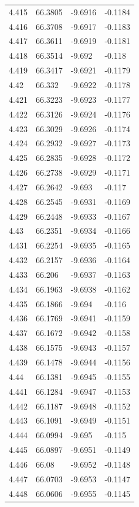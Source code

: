 \begin{tabular}{llll}
4.415 & 66.3805 & -9.6916 & -0.1184 \\
4.416 & 66.3708 & -9.6917 & -0.1183 \\
4.417 & 66.3611 & -9.6919 & -0.1181 \\
4.418 & 66.3514 & -9.692 & -0.118 \\
4.419 & 66.3417 & -9.6921 & -0.1179 \\
4.42 & 66.332 & -9.6922 & -0.1178 \\
4.421 & 66.3223 & -9.6923 & -0.1177 \\
4.422 & 66.3126 & -9.6924 & -0.1176 \\
4.423 & 66.3029 & -9.6926 & -0.1174 \\
4.424 & 66.2932 & -9.6927 & -0.1173 \\
4.425 & 66.2835 & -9.6928 & -0.1172 \\
4.426 & 66.2738 & -9.6929 & -0.1171 \\
4.427 & 66.2642 & -9.693 & -0.117 \\
4.428 & 66.2545 & -9.6931 & -0.1169 \\
4.429 & 66.2448 & -9.6933 & -0.1167 \\
4.43 & 66.2351 & -9.6934 & -0.1166 \\
4.431 & 66.2254 & -9.6935 & -0.1165 \\
4.432 & 66.2157 & -9.6936 & -0.1164 \\
4.433 & 66.206 & -9.6937 & -0.1163 \\
4.434 & 66.1963 & -9.6938 & -0.1162 \\
4.435 & 66.1866 & -9.694 & -0.116 \\
4.436 & 66.1769 & -9.6941 & -0.1159 \\
4.437 & 66.1672 & -9.6942 & -0.1158 \\
4.438 & 66.1575 & -9.6943 & -0.1157 \\
4.439 & 66.1478 & -9.6944 & -0.1156 \\
4.44 & 66.1381 & -9.6945 & -0.1155 \\
4.441 & 66.1284 & -9.6947 & -0.1153 \\
4.442 & 66.1187 & -9.6948 & -0.1152 \\
4.443 & 66.1091 & -9.6949 & -0.1151 \\
4.444 & 66.0994 & -9.695 & -0.115 \\
4.445 & 66.0897 & -9.6951 & -0.1149 \\
4.446 & 66.08 & -9.6952 & -0.1148 \\
4.447 & 66.0703 & -9.6953 & -0.1147 \\
4.448 & 66.0606 & -9.6955 & -0.1145 \\

\end{tabular}

